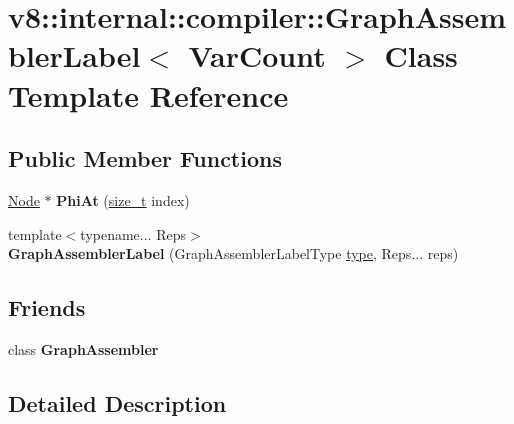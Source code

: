 \hypertarget{classv8_1_1internal_1_1compiler_1_1GraphAssemblerLabel}{}\section{v8\+:\+:internal\+:\+:compiler\+:\+:Graph\+Assembler\+Label$<$ Var\+Count $>$ Class Template Reference}
\label{classv8_1_1internal_1_1compiler_1_1GraphAssemblerLabel}
\subsection*{Public Member Functions}
\begin{DoxyCompactItemize}
\item 
\mbox{\label{classv8_1_1internal_1_1compiler_1_1GraphAssemblerLabel_a13d7965c44a14a5aadd962f58ee84f38}} 
\mbox{\hyperlink{classv8_1_1internal_1_1compiler_1_1Node}{Node}} $\ast$ {\bfseries Phi\+At} (\mbox{\hyperlink{classsize__t}{size\+\_\+t}} index)
\item 
\mbox{\label{classv8_1_1internal_1_1compiler_1_1GraphAssemblerLabel_af72e2bd3d9c6cfe2ccc35d8b723e6a21}} 
{\footnotesize template$<$typename... Reps$>$ }\\{\bfseries Graph\+Assembler\+Label} (Graph\+Assembler\+Label\+Type \mbox{\hyperlink{classstd_1_1conditional_1_1type}{type}}, Reps... reps)
\end{DoxyCompactItemize}
\subsection*{Friends}
\begin{DoxyCompactItemize}
\item 
\mbox{\label{classv8_1_1internal_1_1compiler_1_1GraphAssemblerLabel_a5a36d45c317b0cc3f8aad449f01b8eef}} 
class {\bfseries Graph\+Assembler}
\end{DoxyCompactItemize}


\subsection{Detailed Description}
